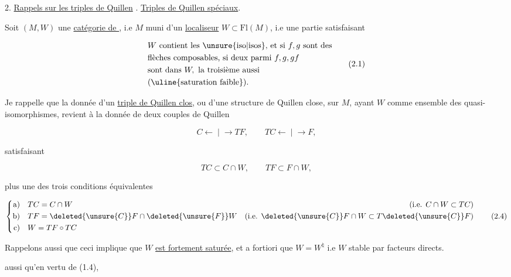 2. \uline{Rappels sur les triples de Quillen} . \uline{ Triples de
Quillen spéciaux}.

Soit $(M,W)$ une \uline{catégorie de }, i.e
$M$ muni d'un \uline{localiseur} $W\subset\mathrm{Fl}(M)$, i.e une
partie satisfaisant

\[
\begin{aligned}
&W\text{ contient les \unsure{iso|isos}, et si }f,g\text{ sont des}\\
&\text{flèches composables, si deux parmi }f,g,gf\\
&\text{sont dans }W,\text{ la troisième aussi}\\
&\text{(\uline{saturation faible}).}
\end{aligned}\tag*{(2.1)}
\]

Je rappelle que la donnée d'un \uline{triple de
Quillen clos}, ou d'une structure de Quillen
close, sur $M$, ayant $W$ comme ensemble des
quasi-isomorphismes, revient à la donnée de
deux couples de Quillen

\[
C \mathrel{\longleftarrow\!\mid\!\longrightarrow} TF,\qquad TC \mathrel{\longleftarrow\!\mid\!\longrightarrow} F,\tag*{(2.2)}
\]

satisfaisant

\[
TC\subset C\cap W,\qquad TF\subset F\cap W,\tag*{(2.3)}
\]

plus une des trois conditions équivalentes

\[
\left\{\begin{aligned}
\text{a)}\quad &TC=C\cap W &(\text{i.e. } C\cap W\subset TC)\\
\text{b)}\quad &TF=\deleted{\unsure{C}}F\cap\deleted{\unsure{F}}W &(\text{i.e. }\deleted{\unsure{C}}F\cap W\subset T\deleted{\unsure{C}}F)\\
\text{c)}\quad &W=TF\circ TC
\end{aligned}\right.\tag*{(2.4)}
\]

Rappelons aussi que ceci implique que $W$ \uline{est fortement saturée},
et a fortiori que $W=W^{\natural}$ i.e
$W$ stable par facteurs directs.

 aussi qu'en vertu de (1.4),  
